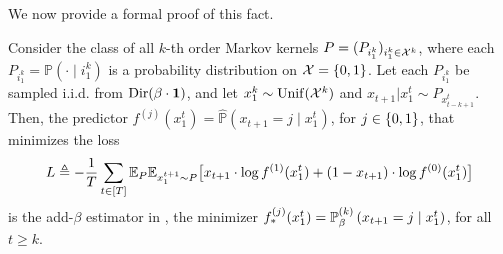We now provide a formal proof of this fact.
\begin{theorem}
Consider the class of all $k$-th order Markov kernels $P = (P_{i_1^k})_{i_1^k \in \mathcal{X}^k}$, where each $P_{i_1^k} = \mathbb{P}(\cdot \mid i_1^k)$ is a probability distribution on $\mathcal{X} = \{0,1\}$. Let each $P_{i_1^k}$ be sampled i.i.d. from $\mathrm{Dir}(\beta \cdot \bm{1})$, and let $x_1^k \sim \mathrm{Unif}(\mathcal{X}^k)$ and $x_{t+1} | x_1^t \sim P_{x_{t-k+1}^t}$. Then, the predictor $f^{(j)}(x_1^t) = \hat{\mathbb{P}}(x_{t+1} = j \mid x_1^t)$, for $j\in\{0,1\}$, that minimizes the loss
\begin{equation}
L \triangleq -\frac{1}{T} \sum_{t \in [T]} \mathbb{E}_P \mathbb{E}_{x_1^{t+1} \sim P}\big[x_{t+1} \cdot \log f^{(1)} (x_1^t) + (1- x_{t+1}) \cdot \log f^{(0)}(x_1^t) \big]
\end{equation}
is the add-$\beta$ estimator in , \ie the minimizer $f_*^{(j)}(x_1^t) = \mathbb{P}_{\beta}^{(k)}\left(x_{t+1} = j \mid x_1^t\right)$, for all $t\geq k$.
\end{theorem}
